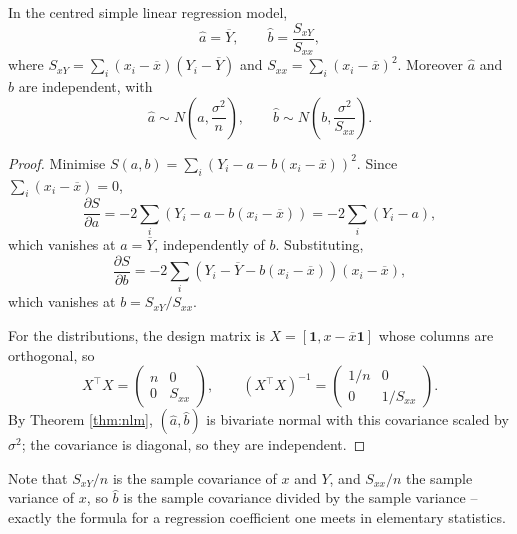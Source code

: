 \begin{proposition}
  In the centred simple linear regression model,
  $$
  \hat a = \overline{Y}, \qquad \hat b = \frac{S_{xY}}{S_{xx}},
  $$
  where $S_{xY} = \sum_i (x_i-\overline{x})(Y_i - \overline{Y})$ and $S_{xx} = \sum_i(x_i-\overline{x})^2$. Moreover $\hat a$ and $\hat b$ are independent, with
  $$
  \hat a \sim N\left(a, \frac{\sigma^2}{n}\right), \qquad \hat b \sim N\left(b, \frac{\sigma^2}{S_{xx}}\right).
  $$
\end{proposition}
\begin{proof}
  Minimise $S(a,b) = \sum_i\left(Y_i - a - b(x_i-\overline{x})\right)^2$. Since $\sum_i(x_i - \overline{x}) = 0$,
  $$
  \frac{\partial S}{\partial a} = -2\sum_i\left(Y_i - a - b(x_i-\overline{x})\right) = -2\sum_i(Y_i - a),
  $$
  which vanishes at $a = \overline{Y}$, independently of $b$. Substituting,
  $$
  \frac{\partial S}{\partial b} = -2\sum_i\left(Y_i - \overline{Y} - b(x_i-\overline{x})\right)(x_i-\overline{x}),
  $$
  which vanishes at $b = S_{xY}/S_{xx}$.

  For the distributions, the design matrix is $X = \left[\mathbf 1, x - \overline{x}\mathbf 1\right]$ whose columns are orthogonal, so
  $$
  X^\top X = \begin{pmatrix}n&0\\0&S_{xx}\end{pmatrix}, \qquad (X^\top X)^{-1} = \begin{pmatrix}1/n&0\\0&1/S_{xx}\end{pmatrix}.
  $$
  By Theorem \ref{thm:nlm}, $(\hat a,\hat b)$ is bivariate normal with this covariance scaled by $\sigma^2$; the covariance is diagonal, so they are independent.
\end{proof}

Note that $S_{xY}/n$ is the sample covariance of $x$ and $Y$, and $S_{xx}/n$ the sample variance of $x$, so $\hat b$ is the sample covariance divided by the sample variance -- exactly the formula for a regression coefficient one meets in elementary statistics.

